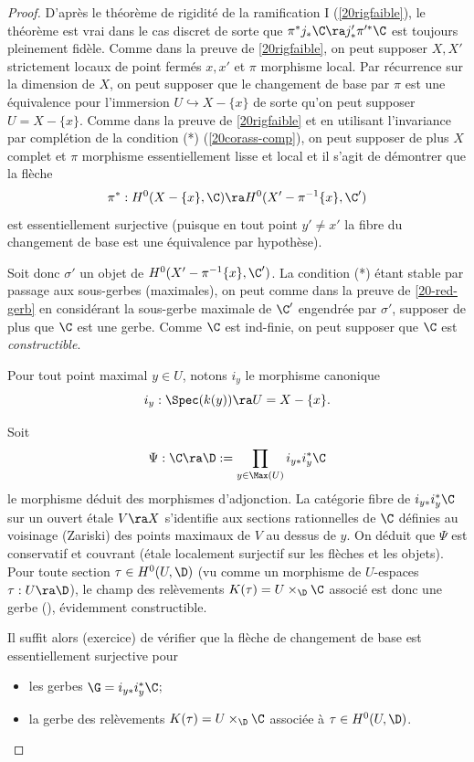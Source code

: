 \documentclass[10pt]{../fichiers-configuration-latex/smfart}
\begin{document}
\begin{proof} D'après le théorème de rigidité de la ramification I (\ref{20rigfaible}), le théorème
est vrai dans le cas discret de sorte que $\pi^*j_*\C\ra j'_*\pi'^*\C$ est toujours pleinement
fidèle.  Comme dans la preuve de \ref{20rigfaible}, on peut supposer $X,X'$ strictement locaux de
point fermés $x,x'$ et $\pi$ morphisme local. Par récurrence sur la dimension de $X$, on peut
supposer que le changement de base par $\pi$ est une équivalence pour l'immersion $U\hookrightarrow
X-\{x\}$ de sorte qu'on peut supposer $U=X-\{x\}$. Comme dans la preuve de \ref{20rigfaible} et en
utilisant l'invariance par complétion de la condition (*) (\ref{20corass-comp}), on peut supposer de
plus $X$ complet et $\pi$ morphisme essentiellement lisse et local et il s'agit de démontrer que la
flèche $$\pi^*:H^0(X-\{x\},\C)\ra H^0(X'-\pi^{-1}\{x\},\C')$$ est essentiellement surjective
(puisque en tout point $y'\not=x'$ la fibre du changement de base est une équivalence par
hypothèse).

Soit donc $\sigma'$ un objet de $H^0(X'-\pi^{-1}\{x\},\C')$. La condition (*) étant stable par
passage aux sous-gerbes (maximales), on peut comme dans la preuve de \ref{20-red-gerb} en
considérant la sous-gerbe maximale de $\C'$ engendrée par $\sigma'$,  supposer de plus que $\C$ est
une gerbe. Comme $\C$ est ind-finie, on peut supposer que $\C$ est \emph{constructible}.

Pour tout point maximal $y\in U$, notons $i_y$ le morphisme canonique $$i_y:\Spec(k(y))\ra
U=X-\{x\}.$$


 Soit $$\Psi : \C\ra\D:=\prod_{y\in \Max(U)}i_{y*}i_{y}^*\C$$ le morphisme déduit des morphismes
d'adjonction. La catégorie fibre de $i_{y*}i_{y}^*\C$ sur un ouvert étale $V\ra X$ s'identifie aux
sections rationnelles de $\C$ définies au voisinage (Zariski) des points maximaux de $V$ au dessus
de $y$. On déduit que $\Psi$ est conservatif et couvrant (étale localement surjectif sur les flèches
et les objets). Pour toute section $\tau\in H^0(U,\D)$ (vu comme un morphisme de $U$-espaces $\tau
:U\ra\D$), le champ des relèvements $K(\tau)=U\times_{\D}\C$ associé  est  donc une gerbe
(\cite[IV.2.5.4]{CNA@Giraud}), évidemment constructible.

Il suffit alors (exercice) de vérifier que la flèche de changement de base est essentiellement
surjective pour \begin{itemize}

  \item [1)] les gerbes $\G=i_{y*}i_{y}^*\C$; \item [2)] la gerbe des relèvements
$K(\tau)=U\times_{\D}\C$ associée à $\tau\in H^0(U,\D)$.  \end{itemize}


\end{proof}
\end{document}
